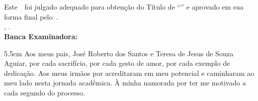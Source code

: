 \imprimircapa

\imprimirfolhaderosto*

\begin{fichacatalografica}
	
\end{fichacatalografica}

\begin{folhadeaprovacao}
	\OnehalfSpacing
	\centering
	\imprimirautor\\%
	\vspace*{10pt}		
	\textbf{\imprimirtitulo}%
	\ifnotempty{\imprimirsubtitulo}{:~\imprimirsubtitulo}\\%
	\vspace*{\baselineskip}
	Este~\imprimirtipotrabalho~foi julgado adequado para obtenção do Título de “\imprimirformacao” e aprovado em sua forma final pelo~\imprimirprograma. \\
		\vspace*{\baselineskip}
	\imprimirlocal, \imprimirdata. \\
	\vspace*{2\baselineskip}
	\vspace*{2\baselineskip}
	\textbf{Banca Examinadora:} \\
	\vspace*{\baselineskip}
	\assinatura{\OnehalfSpacing\imprimirorientador \\ \imprimirorientadorRotulo}
	\vspace*{\baselineskip}

	\vspace*{\baselineskip}


\end{folhadeaprovacao}

\begin{dedicatoria}
    \vspace*{\fill}
    \noindent
    \begin{adjustwidth*}{}{5.5cm}     
        Aos meus pais, José Roberto dos Santos e Teresa de Jesus de Souza Aguiar, por cada sacrifício, por cada gesto de amor, por cada exemplo de dedicação. Aos meus irmãos por acreditaram em meu potencial e caminharam ao meu lado nesta jornada acadêmica. À minha namorada por ter me motivado a cada segundo do processo.
    \end{adjustwidth*}
\end{dedicatoria}

